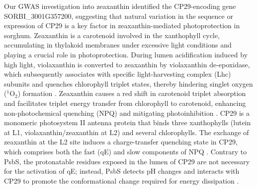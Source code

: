 \documentclass[10pt,letterpaper]{article}
\begin{document}
Our GWAS investigation into zeaxanthin identified the CP29-encoding gene SORBI\_3001G357200, suggesting that natural variation in the sequence or expression of CP29 is a key factor in zeaxanthin-mediated photoprotection in sorghum. Zeaxanthin is a carotenoid involved in the xanthophyll cycle, accumulating in thylakoid membranes under excessive light conditions and playing a crucial role in photoprotection. During lumen acidification induced by high light, violaxanthin is converted to zeaxanthin by violaxanthin de-epoxidase, which subsequently associates with specific light-harvesting complex (Lhc) subunits and quenches chlorophyll triplet states, thereby hindering singlet oxygen (\(^{1}\mathrm{O}_{2}\)) formation \citep{DallOsto2012}. Zeaxanthin causes a red shift in carotenoid triplet absorption and facilitates triplet energy transfer from chlorophyll to carotenoid, enhancing non-photochemical quenching (NPQ) and mitigating photoinhibition \citep{DallOsto2012,DemmigAdams2020}. CP29 is a monomeric photosystem II antenna protein that binds three xanthophylls (lutein at L1, violaxanthin/zeaxanthin at L2) and several chlorophylls. The exchange of zeaxanthin at the L2 site induces a charge-transfer quenching state in CP29, which comprises both the fast (qE) and slow components of NPQ \citep{Guardini2020}. Contrary to PsbS, the protonatable residues exposed in the lumen of CP29 are not necessary for the activation of qE; instead, PsbS detects pH changes and interacts with CP29 to promote the conformational change required for energy dissipation \citep{Guardini2020}.
\end{document}
